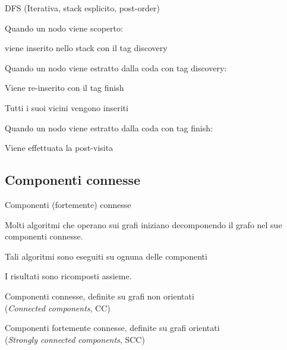 \begin{frame}{DFS (Iterativa, stack esplicito, post-order)}

\BIL
\item Quando un nodo viene scoperto:
  \BI
  \item  viene inserito nello stack con il tag \textsf{discovery}
  \EI
\item Quando un nodo viene estratto dalla coda con tag \textsf{discovery}:
  \BI
  \item Viene re-inserito con il tag \textsf{finish}
  \item Tutti i suoi vicini vengono inseriti
  \EI
\item Quando un nodo viene estratto dalla coda con tag \textsf{finish}:
  \BI
  \item Viene effettuata la post-visita
  \EI
\EIL
\end{frame}


\subsection{Componenti connesse}

\begin{frame}{Componenti (fortemente) connesse}

\begin{myboxtitle}[Motivazioni]
\BIL
\item Molti algoritmi che operano sui grafi iniziano decomponendo 
il grafo nel sue componenti connesse.
\item Tali algoritmi sono eseguiti su ognuna delle componenti
\item I risultati sono ricomposti assieme.
\EIL
\end{myboxtitle}

\begin{myboxtitle}[Definizioni]
\BIL
\item \alert{Componenti connesse}, definite su grafi \alert{non orientati}\\
(\emph{Connected components}, CC)
\item \alert{Componenti fortemente connesse}, definite su \alert{grafi orientati}\\
(\emph{Strongly connected components}, SCC)
\EIL
\end{myboxtitle}

\end{frame}

